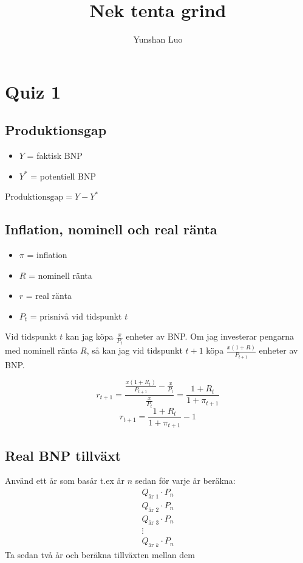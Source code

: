 \documentclass[12pt,a4paper]{article}
\title{Nek tenta grind}
\author{Yunshan Luo}
\begin{document}
\section{Quiz 1}
\subsection{Produktionsgap}
\begin{itemize}
    \item $Y$ = faktisk BNP
    \item $Y^*$ = potentiell BNP
\end{itemize}
$
\text{Produktionsgap} = Y - Y^*
$

\subsection{Inflation, nominell och real ränta}
\begin{itemize}
    \item $\pi$ = inflation
    \item $R$ = nominell ränta
    \item $r$ = real ränta
    \item $P_t$ = prisnivå vid tidspunkt $t$
\end{itemize}
Vid tidspunkt $t$ kan jag köpa $\frac{x}{P_t}$ enheter av BNP. Om jag investerar pengarna med nominell ränta $R$, så kan jag vid tidspunkt $t+1$ köpa $\frac{x(1+R)}{P_{t+1}}$ enheter av BNP.

{\Large 
\[ 
r_{t+1} = \frac{\frac{x(1+R_t)}{P_{t+1}} - \frac{x}{P_t}}{\frac{x}{P_t}} =
\frac{1 + R_t}{1 + \pi_{t+1}}
\]
\[
r_{t+1} = \frac{1 + R_t}{1 + \pi_{t+1}} - 1
\]
}

\subsection{Real BNP tillväxt}
Använd ett år som basår t.ex år $n$ sedan för varje år beräkna:
\begin{gather*}
Q_{\text{år } 1} \cdot P_{n} \\
Q_{\text{år } 2} \cdot P_{n} \\
Q_{\text{år } 3} \cdot P_{n} \\
\vdots \\
Q_{\text{år } k} \cdot P_{n}
\end{gather*}
Ta sedan två år och beräkna tillväxten mellan dem
\end{document}
